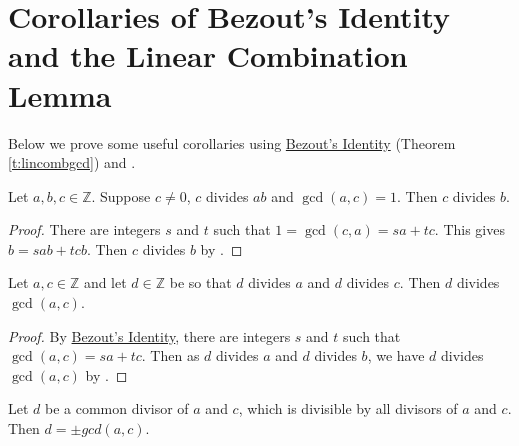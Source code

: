 \documentclass[11pt,dvipsnames]{book}
\def\Z{\mathbb{Z}}
\numberwithin{equation}{section} %
\numberwithin{figure}{section} %
\numberwithin{table}{section} %
\begin{document}
%







\section{Corollaries of Bezout's Identity and the Linear Combination Lemma}

Below we prove some useful corollaries using  \hyperref[t:lincombgcd]{ Bezout's Identity} (Theorem \ref{t:lincombgcd}) and \easylemma.

 \begin{corollary} 
 \label{c:c|abc|b}
 Let $a,b,c\in\Z$. Suppose $c\neq
0$, $c$ divides $ab$ and $\gcd(a,c)=1$. Then $c$ divides $b$. 
\end{corollary}

\begin{proof}
There are integers $s$ and $t$ such that $1=\gcd(c,a)=sa+tc$. This gives $b=sab+tcb$.  Then $c$ divides $b$ by \easylemma . 
 \end{proof}
 
\begin{corollary} Let $a,c\in\Z$ and let $d\in\mathbb{Z}$ be so that $d$ divides $a$ and $d$ divides $c$.  Then $d$ divides $\gcd(a,c)$. 
\end{corollary}

\begin{proof}
By  \hyperref[t:lincombgcd]{ Bezout's Identity}, there are integers $s$ and $t$ such that
$\gcd(a,c)=sa+tc$.
 Then as $d$ divides $a$ and $d$ divides $b$, we have $d$ divides $\gcd(a,c)$ by \easylemma. 
\end{proof}

\begin{corollary} Let $d$ be a common divisor of
 $a$ and $c$, which is divisible by all divisors of $a$ and $c$. Then $d = \pm gcd(a,c)$.
\end{corollary}
\end{document}
